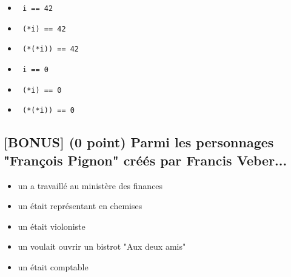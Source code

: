 \documentclass[11pt,a4paper]{article}
\begin{document}
\begin{itemize}
  \item[\CaseCoche] \lstinline[style=algorithmique]! i == 42 ! \\
  \item[\CaseCoche] \lstinline[style=algorithmique]! (*i) == 42 ! \\
  \item[\CaseCoche] \lstinline[style=algorithmique]! (*(*i)) == 42 ! \\
  \item[\CaseCoche] \lstinline[style=algorithmique]! i == 0 ! \\
  \item[\CaseCoche] \lstinline[style=algorithmique]! (*i) == 0 ! \\
  \item[\CaseCoche] \lstinline[style=algorithmique]! (*(*i)) == 0 ! \\
\end{itemize}


\bigskip


\subsection{[BONUS] (0 point) Parmi les personnages "François Pignon" créés par Francis Veber... }

\begin{itemize}
  \item[\CaseCoche] un a travaillé au ministère des finances \\ %
  \item[\CaseCoche] un était représentant en chemises \\ %
  \item[\CaseCoche] un était violoniste \\ %
  \item[\CaseCoche] un voulait ouvrir un bistrot "Aux deux amis" \\ %
  \item[\CaseCoche] un était comptable \\ %
\end{itemize}
\end{document}
